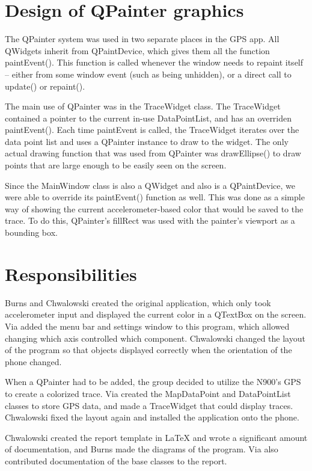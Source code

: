\documentclass[12pt]{article}
\begin{document}
\section{Design of QPainter graphics}
The QPainter system was used in two separate places in the GPS app.  All
QWidgets inherit from QPaintDevice, which gives them all the function paintEvent().
This function is called whenever the window needs to repaint itself -- either
from some window event (such as being unhidden), or a direct call to update() or
repaint().  

The main use of QPainter was in the TraceWidget class.  The TraceWidget
contained a pointer to the current in-use DataPointList, and has an overriden
paintEvent().  Each time paintEvent is called, the TraceWidget iterates over the
data point list and uses a QPainter instance to draw to the widget.  The only
actual drawing function that was used from QPainter was drawEllipse() to draw
points that are large enough to be easily seen on the screen.

Since the MainWindow class is also a QWidget and also is a QPaintDevice, we were
able to override its paintEvent() function as well.  This was done as a simple
way of showing the current accelerometer-based color that would be saved to the
trace.  To do this, QPainter's fillRect was used with the painter's viewport as
a bounding box.  

\section{Responsibilities}
Burns and Chwalowski created the original application, which only took
accelerometer input and displayed the current color in a QTextBox on the screen.
Via added the menu bar and settings window to this program, which allowed
changing which axis controlled which component. Chwalowski changed the layout of
the program so that objects displayed correctly when the orientation of the
phone changed.

When a QPainter had to be added, the group decided to utilize the N900's GPS to
create a colorized trace. Via created the MapDataPoint and DataPointList classes
to store GPS data, and made a TraceWidget that could display traces. Chwalowski
fixed the layout again and installed the application onto the phone.

Chwalowski created the report template in LaTeX and wrote a significant amount
of documentation, and Burns made the diagrams of
the program. Via also contributed documentation of the base classes to the
report.
\end{document}
